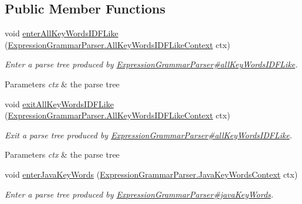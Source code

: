 \subsection*{Public Member Functions}
\begin{DoxyCompactItemize}
\item 
void \hyperlink{classgov_1_1nasa_1_1jpf_1_1inspector_1_1server_1_1expression_1_1parser_1_1_expression_grammar_base_listener_ae32e14ae6306dae857239430a3be378f}{enter\+All\+Key\+Words\+I\+D\+F\+Like} (\hyperlink{classgov_1_1nasa_1_1jpf_1_1inspector_1_1server_1_1expression_1_1parser_1_1_expression_grammar_pad664d42a2aee14226e172b869b9ffb3b}{Expression\+Grammar\+Parser.\+All\+Key\+Words\+I\+D\+F\+Like\+Context} ctx)
\begin{DoxyCompactList}\small\item\em Enter a parse tree produced by \hyperlink{classgov_1_1nasa_1_1jpf_1_1inspector_1_1server_1_1expression_1_1parser_1_1_expression_grammar_parser_abed0177f437ea92b0f2f8165987fdf59}{Expression\+Grammar\+Parser\#all\+Key\+Words\+I\+D\+F\+Like}.


\begin{DoxyParams}{Parameters}
{\em ctx} & the parse tree\\
\hline
\end{DoxyParams}
 \end{DoxyCompactList}\item 
void \hyperlink{classgov_1_1nasa_1_1jpf_1_1inspector_1_1server_1_1expression_1_1parser_1_1_expression_grammar_base_listener_a68841c30fa3c2ae387c0e75e09c1e7a5}{exit\+All\+Key\+Words\+I\+D\+F\+Like} (\hyperlink{classgov_1_1nasa_1_1jpf_1_1inspector_1_1server_1_1expression_1_1parser_1_1_expression_grammar_pad664d42a2aee14226e172b869b9ffb3b}{Expression\+Grammar\+Parser.\+All\+Key\+Words\+I\+D\+F\+Like\+Context} ctx)
\begin{DoxyCompactList}\small\item\em Exit a parse tree produced by \hyperlink{classgov_1_1nasa_1_1jpf_1_1inspector_1_1server_1_1expression_1_1parser_1_1_expression_grammar_parser_abed0177f437ea92b0f2f8165987fdf59}{Expression\+Grammar\+Parser\#all\+Key\+Words\+I\+D\+F\+Like}.


\begin{DoxyParams}{Parameters}
{\em ctx} & the parse tree\\
\hline
\end{DoxyParams}
 \end{DoxyCompactList}\item 
void \hyperlink{classgov_1_1nasa_1_1jpf_1_1inspector_1_1server_1_1expression_1_1parser_1_1_expression_grammar_base_listener_adb5986d3ee677fbd4bd1909ae547fc72}{enter\+Java\+Key\+Words} (\hyperlink{classgov_1_1nasa_1_1jpf_1_1inspector_1_1server_1_1expression_1_1parser_1_1_expression_grammar_parser_1_1_java_key_words_context}{Expression\+Grammar\+Parser.\+Java\+Key\+Words\+Context} ctx)
\begin{DoxyCompactList}\small\item\em Enter a parse tree produced by \hyperlink{classgov_1_1nasa_1_1jpf_1_1inspector_1_1server_1_1expression_1_1parser_1_1_expression_grammar_parser_ad2052f91a11b56131e3a746447f36634}{Expression\+Grammar\+Parser\#java\+Key\+Words}.



\end{DoxyCompactList}
\end{DoxyCompactItemize}
